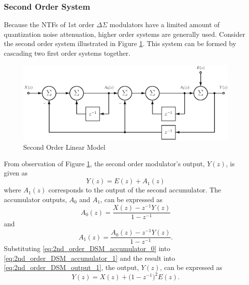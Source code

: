 \subsubsection{Second Order System}
Because the NTFs of 1st order $\Delta\Sigma$ modulators have a limited amount of
quantization noise attenuation, higher order systems are generally used. Consider the
second order system illustrated in Figure \ref{fig:linear_z_model_2nd_order}. This
system can be formed by cascading two first order systems together. 
\begin{figure}
  \centering
  \includegraphics[width=\textwidth]{./final_figures/second_order_simple_model.eps}
  \caption{Second Order Linear Model}
  \label{fig:linear_z_model_2nd_order}
\end{figure}
From observation of Figure \ref{fig:linear_z_model_2nd_order}, the second order \DS
modulator's output, $Y(z)$, is given
as
\begin{equation}\label{eq:2nd_order_DSM_output_1}
 Y(z)=E(z)+A_1(z)
\end{equation}
where $A_1(z)$ corresponds to the output of the second accumulator. The accumulator
outputs, $A_{0}$ and $A_{1}$, can be expressed as
\begin{equation}\label{eq:2nd_order_DSM_accumulator_0}
  A_{0}(z) = \frac{X(z)-z^{-1}Y(z)}{1-z^{-1}}
 \end{equation}
and
\begin{equation}\label{eq:2nd_order_DSM_accumulator_1}
  A_{1}(z) = \frac{A_{0}(z)-z^{-1}Y(z)}{1-z^{-1}}\text{.}
\end{equation}
Substituting \eqref{eq:2nd_order_DSM_accumulator_0} into
\eqref{eq:2nd_order_DSM_accumulator_1} and the result into
\eqref{eq:2nd_order_DSM_output_1}, the
output, $Y(z)$, can be expressed as 
\begin{equation}\label{eq:2nd_order_DSM_output}
  Y(z) = X(z)+ \bigl(1-z^{-1}\bigr)^2 E(z)\text{.}
\end{equation}
